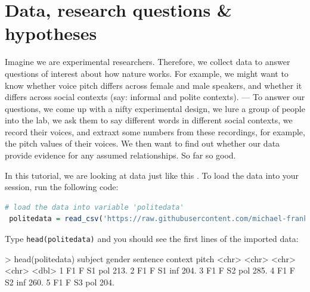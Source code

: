 \documentclass[nobib]{tufte-handout}
\newcommand{\ri}[1]{\lstinline{#1}}  %
\begin{document}
\section{Data, research questions \& hypotheses}
\label{sec:data}

Imagine we are experimental researchers. Therefore, we collect data to answer questions of
interest about how nature works. For example, we might want to know whether voice pitch differs across female and male speakers, and whether it differs across social contexts (say: informal and polite contexts). --- To answer our questions, we come up with a nifty experimental design, we lure a group of people into the lab, we ask them to say different words in different social contexts, we record their voices, and extraxt some numbers from these recordings, for example, the pitch values of their voices. We then want to find out whether our data provide evidence for any assumed relationships. So far so good.

In this tutorial, we are looking at data just like this
\citep[following][]{Winter2013:Linear-models-a}. To load the data into your session,
run the following code:

\medskip


\begin{minipage}[]{\textwidth}
\begin{lstlisting}[language=R]
  # load the data into variable 'politedata'
 politedata = read_csv('https://raw.githubusercontent.com/michael-franke/bayes_mixed_regression_tutorial/master/code/politeness_data.csv') 
\end{lstlisting}
\end{minipage}

\vspace*{-0.5cm}

\noindent Type \ri{head(politedata)} and you should see the first lines of the imported
data:

\medskip

\begin{minipage}[]{\textwidth}
\begin{rc}
> head(politedata)
   subject gender sentence context pitch
   <chr>   <chr>  <chr>    <chr>   <dbl>
 1 F1      F      S1       pol      213.
 2 F1      F      S1       inf      204.
 3 F1      F      S2       pol      285.
 4 F1      F      S2       inf      260.
 5 F1      F      S3       pol      204.
\end{rc}
\end{minipage}
\end{document}
